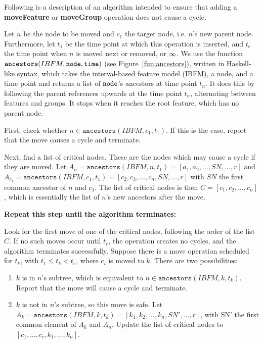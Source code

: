 Following is a description of an algorithm intended to ensure that adding a \textbf{moveFeature} or \textbf{moveGroup} operation does not cause a cycle.

Let $n$ be the node to be moved and $c_1$ the target node, i.e. $n$'s new parent node. Furthermore, let $t_1$ be the time point at which this operation is inserted, and $t_e$ the time point when $n$ is moved next or removed, or $\infty$. We use the function $\texttt{ancestors}(IBFM, \texttt{node}, \texttt{time})$ (see Figure~\ref{fun:ancestors}), written in Haskell-like syntax, which takes the interval-based feature model (IBFM), a node, and a time point and returns a list of $\texttt{node}$'s ancestors at time point $t_n$. It does this by following the parent references upwards at the time point $t_n$, alternating between features and groups. It stops when it reaches the root feature, which has no parent node.

First, check whether $n \in \texttt{ancestors}(IBFM, c_1, t_1)$. If this is the case, report that the move causes a cycle and terminate. 

Next, find a list of critical nodes. These are the nodes which may cause a cycle if they are moved. 
Let $A_n = \texttt{ancestors}(IBFM, n, t_1) = [a_1, a_2, \dots, SN, \dots, r]$ and $A_{c_1} = \texttt{ancestors}(IBFM, c_1, t_1) = [c_2 \comma c_3 \comma \dots \comma c_n \comma SN \comma \dots \comma r]$ with $SN$ the first common ancestor of $n$ and $c_1$. The list of critical nodes is then $C = [c_1, c_2, \dots, c_n]$, which is essentially the list of $n$'s new ancestors after the move. 

\textbf{Repeat this step until the algorithm terminates:}

Look for the first move of one of the critical nodes, following the order of the list $C$. If no such moves occur until $t_e$, the operation creates no cycles, and the algorithm terminates successfully.  
  Suppose there is a move operation scheduled for $t_k$, with $t_1 \leq t_k < t_e$, where $c_i$ is moved to $k$. There are two possibilities:  
  \begin{enumerate}
    \item $k$ is in $n$'s subtree, which is equivalent to $n \in \texttt{ancestors}(IBFM, k, t_k)$. Report that the move will cause a cycle and terminate. 
\item $k$ is not in $n$'s subtree, so this move is safe. Let $A_k = \texttt{ancestors}(IBFM, k, t_k) = [k_1, k_2, \dots, k_n, SN', \dots, r]$, with SN' the first common element of $A_k$ and $A_n$. Update the list of critical nodes to $[c_1, \dots, c_i, k_1, \dots, k_n]$.
  \end{enumerate}

